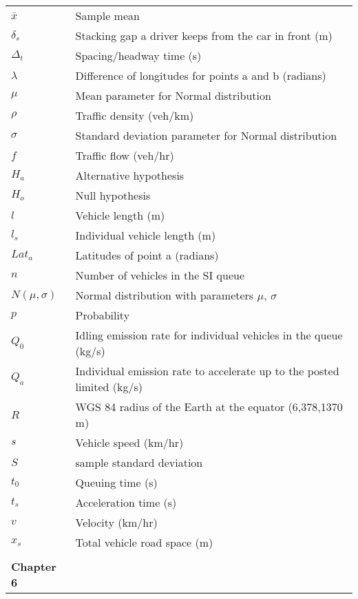 \begin{longtable}{ll}
$\bar{x}$ & Sample mean \\
$\delta_{s}$ & Stacking gap a driver keeps from the car in front (m) \\
$\Delta_{t}$ & Spacing/headway time (s) \\
$\lambda$ & Difference of longitudes for points a and b (radians) \\
$\mu$ & Mean parameter for Normal distribution \\
$\rho$ & Traffic density (veh/km) \\
$\sigma$ & Standard deviation parameter for Normal distribution \\
$f$ & Traffic flow (veh/hr) \\
$H_{a}$ & Alternative hypothesis \\
$H_{o}$ & Null hypothesis \\
$l$ & Vehicle length (m) \\
$l_{s}$ & Individual vehicle length (m) \\
$Lat_{a}$ & Latitudes of point a (radians) \\
$n$ & Number of vehicles in the SI queue \\
$N(\mu,\sigma)$ & Normal distribution with parameters $\mu$, $\sigma$ \\
$p$ & Probability \\
$Q_{0}$ & Idling emission rate for individual vehicles in the queue (kg/s) \\
$Q_{a}$ & Individual emission rate to accelerate up to the posted limited (kg/s) \\
$R$ & WGS 84 radius of the Earth at the equator (6,378,1370 m) \\
$s$ & Vehicle speed (km/hr) \\
$S$ & sample standard deviation \\
$t_{0}$ & Queuing time (s) \\
$t_{s}$ & Acceleration time (s) \\
$v$ & Velocity (km/hr) \\
$x_{s}$ & Total vehicle road space (m)\\
\\
\bigskip

\textbf{Chapter 6}\\


\end{longtable}
